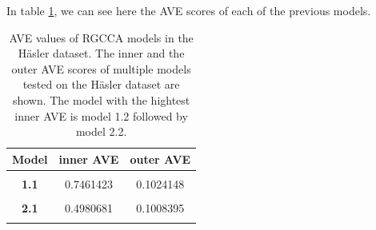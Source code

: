 \documentclass[
  12pt,
  a4paper,
  twoside,
  openright]{book}
\begin{document}
\begin{table}[H]

\caption[Model 2.2 of the Häsler dataset.]{\label{tab:hasler-model-2-2}Model 2.2 of the Häsler dataset. 0 indicates no relationship and 1 indicates a strong relationship. RNAseq is related to the microbiota and location (much stronger), the microbiota to the demographic and time (stronger) and demographic and time are linked too.}
\centering
{}
\end{table}

In table \ref{tab:hasler-aves}, we can see here the AVE scores of each of the previous models.

\begin{table}[H]

\caption[AVE values of RGCCA models in the Häsler dataset.]{\label{tab:hasler-aves}AVE values of RGCCA models in the Häsler dataset. The inner and the outer AVE scores of multiple models tested on the Häsler dataset are shown. The model with the hightest inner AVE is model 1.2 followed by model 2.2.}
\centering
\begin{tabular}[t]{>{}c|c|c}
\hline
\textbf{Model} & \textbf{inner AVE} & \textbf{outer AVE}\\
\hline
\textbf{\cellcolor{gray!6}{0}} & \cellcolor{gray!6}{0.8217371} & \cellcolor{gray!6}{0.0961236}\\
\hline
\textbf{1.1} & 0.7461423 & 0.1024148\\
\hline
\textbf{\cellcolor{gray!6}{1.2}} & \cellcolor{gray!6}{0.8349410} & \cellcolor{gray!6}{0.1025486}\\
\hline
\textbf{2.1} & 0.4980681 & 0.1008395\\
\hline
\textbf{\cellcolor{gray!6}{2.2}} & \cellcolor{gray!6}{0.7513065} & \cellcolor{gray!6}{0.1009915}\\
\hline
\end{tabular}
\end{table}
\end{document}

